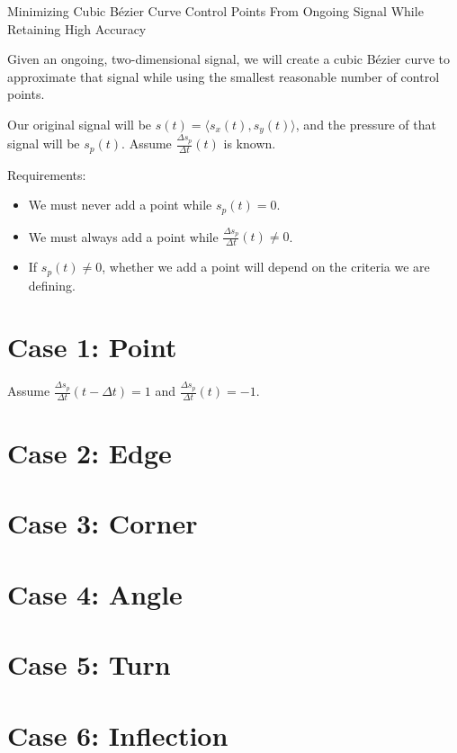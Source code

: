 \documentclass[12pt]{article}
\begin{document}
\begin{center}
    {\Large Minimizing Cubic B\'ezier Curve Control Points From Ongoing Signal While Retaining High Accuracy}
\end{center}

Given an ongoing, two-dimensional signal, we will create a cubic B\'ezier curve to approximate that signal while using the smallest reasonable number of control points.

Our original signal will be \(s(t) = \langle s_x(t),s_y(t) \rangle\), and the pressure of that signal will be \(s_p(t)\).
Assume \(\frac{\Delta s_p}{\Delta t}(t)\) is known.

Requirements:
\begin{itemize}
    \item We must never add a point while \(s_p(t) = 0\).
    \item We must always add a point while \(\frac{\Delta s_p}{\Delta t}(t) \ne 0\).
    \item If \(s_p(t) \ne 0\), whether we add a point will depend on the criteria we are defining.
\end{itemize}

\section*{Case 1: Point}

Assume \(\frac{\Delta s_p}{\Delta t}(t - \Delta t) = 1\) and \(\frac{\Delta s_p}{\Delta t}(t) = -1\).

\section*{Case 2: Edge}

\section*{Case 3: Corner}

\section*{Case 4: Angle}

\section*{Case 5: Turn}

\section*{Case 6: Inflection}

\begin{center}
\end{center}
\end{document}
